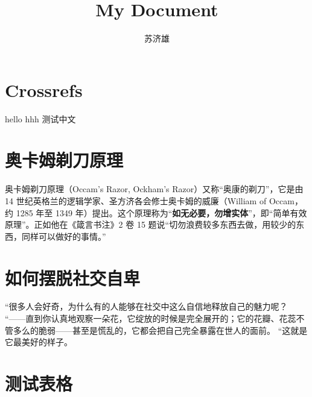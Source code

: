 \documentclass[
  a4paper,
]{article}
\title{My Document}
\author{苏济雄}
\date{}
\renewcommand*\contentsname{Table of contents}
\newcommand\contentsname{Table of contents}
\begin{document}
\maketitle
\ifdefined\Shaded\renewenvironment{Shaded}{\begin{tcolorbox}[colback={shadecolor}, enhanced, boxrule=0pt, breakable, frame hidden]}{\end{tcolorbox}}\fi

\renewcommand*\contentsname{Contents}
{
\hypersetup{linkcolor=}
\setcounter{tocdepth}{2}
\tableofcontents
}
\hypertarget{crossrefs}{%
\section{Crossrefs}\label{crossrefs}}

hello \cite{sevastre2022intracellular} hhh \cite{kucera2020prostate}
测试中文 \cite{董文鸳2011我国谷歌学术搜索研究综述}

\hypertarget{ux5965ux5361ux59c6ux5243ux5200ux539fux7406}{%
\section{奥卡姆剃刀原理}\label{ux5965ux5361ux59c6ux5243ux5200ux539fux7406}}

奥卡姆剃刀原理（Occam's Razor, Ockham's
Razor）又称``奥康的剃刀''，它是由 14
世纪英格兰的逻辑学家、圣方济各会修士奥卡姆的威廉（William of Occam，约
1285 年至 1349
年）提出。这个原理称为``\textbf{如无必要，勿增实体}''，即``简单有效原理''。正如他在《箴言书注》2
卷 15 题说``切勿浪费较多东西去做，用较少的东西，同样可以做好的事情。''

\hypertarget{ux5982ux4f55ux6446ux8131ux793eux4ea4ux81eaux5351}{%
\section{如何摆脱社交自卑}\label{ux5982ux4f55ux6446ux8131ux793eux4ea4ux81eaux5351}}

``很多人会好奇，为什么有的人能够在社交中这么自信地释放自己的魅力呢？
``------直到你认真地观察一朵花，它绽放的时候是完全展开的；它的花瓣、花蕊不管多么的脆弱------甚至是慌乱的，它都会把自己完全暴露在世人的面前。
``这就是它最美好的样子。

\hypertarget{ux6d4bux8bd5ux8868ux683c}{%
\section{测试表格}\label{ux6d4bux8bd5ux8868ux683c}}
\end{document}
